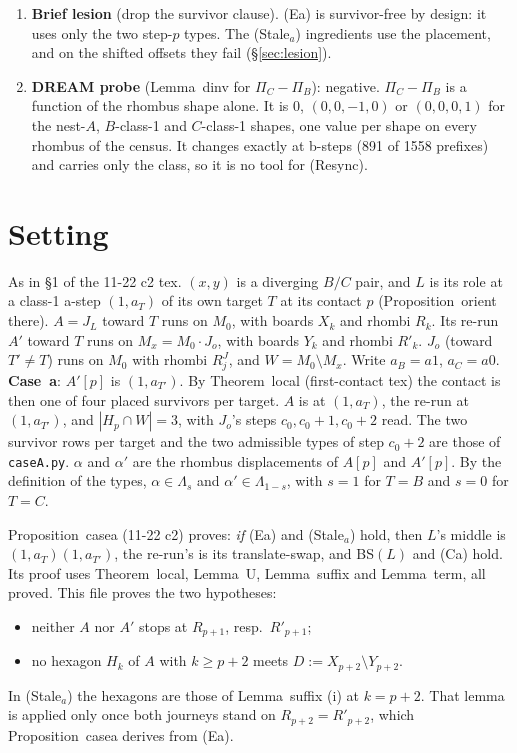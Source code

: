 \documentclass[11pt]{article}
\theoremstyle{definition}\newtheorem{definition}[theorem]{Definition}\newtheorem{remark}[theorem]{Remark}
\begin{document}
\begin{enumerate}
\item \textbf{Brief lesion} (drop the survivor clause). (Ea) is survivor-free by design: it uses only the two step-$p$ types. The (Stale$_a$) ingredients use the placement, and on the shifted offsets they fail (\S\ref{sec:lesion}).
\item \textbf{DREAM probe} (Lemma~dinv for $\Pi_C-\Pi_B$): negative. $\Pi_C-\Pi_B$ is a function of the rhombus shape alone. It is $0$, $(0,0,-1,0)$ or $(0,0,0,1)$ for the nest-$A$, $B$-class-1 and $C$-class-1 shapes, one value per shape on every rhombus of the census. It changes exactly at b-steps (891 of 1558 prefixes) and carries only the class, so it is no tool for (Resync).
\end{enumerate}

\section{Setting}\label{sec:set}
As in \S1 of the 11-22 c2 tex. $(x,y)$ is a diverging $B/C$ pair, and $L$ is its role at a class-1 a-step $(1,a_T)$ of its own target $T$ at its contact $p$ (Proposition~orient there). $A=J_L$ toward $T$ runs on $M_0$, with boards $X_k$ and rhombi $R_k$. Its re-run $A'$ toward $T$ runs on $M_x=M_0\cdot J_o$, with boards $Y_k$ and rhombi $R'_k$. $J_o$ (toward $T'\ne T$) runs on $M_0$ with rhombi $R^J_j$, and $W=M_0\setminus M_x$. Write $a_B=a1$, $a_C=a0$. \textbf{Case~a}: $A'[p]$ is $(1,a_{T'})$. By Theorem~local (first-contact tex) the contact is then one of four placed survivors per target. $A$ is at $(1,a_T)$, the re-run at $(1,a_{T'})$, and $|H_p\cap W|=3$, with $J_o$'s steps $c_0,c_0+1,c_0+2$ read. The two survivor rows per target and the two admissible types of step $c_0+2$ are those of \texttt{caseA.py}. $\alpha$ and $\alpha'$ are the rhombus displacements of $A[p]$ and $A'[p]$. By the definition of the types, $\alpha\in\Lambda_s$ and $\alpha'\in\Lambda_{1-s}$, with $s=1$ for $T=B$ and $s=0$ for $T=C$.

Proposition~casea (11-22 c2) proves: \emph{if} (Ea) and (Stale$_a$) hold, then $L$'s middle is $(1,a_T)(1,a_{T'})$, the re-run's is its translate-swap, and BS$(L)$ and (Ca) hold. Its proof uses Theorem~local, Lemma~U, Lemma~suffix and Lemma~term, all proved. This file proves the two hypotheses:
\begin{itemize}
\item[\textbf{(Ea)}] neither $A$ nor $A'$ stops at $R_{p+1}$, resp.\ $R'_{p+1}$;
\item[\textbf{(Stale$_a$)}] no hexagon $H_k$ of $A$ with $k\ge p+2$ meets $D:=X_{p+2}\setminus Y_{p+2}$.
\end{itemize}
In (Stale$_a$) the hexagons are those of Lemma~suffix (i) at $k=p+2$. That lemma is applied only once both journeys stand on $R_{p+2}=R'_{p+2}$, which Proposition~casea derives from (Ea).
\end{document}
